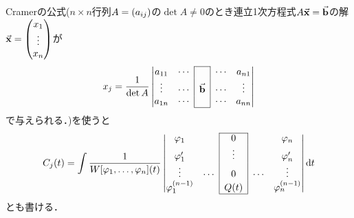 \documentclass[autodetect-engine,dvipdfmx-if-dvi,ja=standard]{bxjsarticle}
\theoremstyle{mystyle1}
\theoremstyle{mystyle2}
\begin{document}
Cramerの公式($n\times n$行列$A=\qty(a_{ij})$の$\det A\neq 0$のとき連立1次方程式$A\va{x}=\va{b}$の解$\va{x}=\mqty(x_1\\\vdots\\x_n)$が\begin{align*}
  x_j=\frac{1}{\det A}\mdet{
    \cline{3-3}
  a_{11} & \cdots & \multicolumn{1}{|c|}{ }      & \cdots & a_{n1} \\
  \vdots & \cdots & \multicolumn{1}{|c|}{\va{b}} & \cdots & \vdots \\
  a_{1n} & \cdots & \multicolumn{1}{|c|}{ }      & \cdots & a_{nn} \\
    \cline{3-3}
  }
\end{align*}で与えられる．)を使うと\begin{align*}
  C_j\qty(t)=\int\frac{1}{W\qty[\varphi_1,\ldots,\varphi_n]\qty(t)}\mdet{
    \cline{3-3}
  \varphi_1             &        & \multicolumn{1}{|c|}{0}        &        & \varphi_n             \\
  \varphi_1^\prime      &        & \multicolumn{1}{|c|}{\vdots}   &        & \varphi_n^\prime      \\
  \vdots                & \cdots & \multicolumn{1}{|c|}{0}        & \cdots & \vdots                \\
  \varphi_1^{\qty(n-1)} &        & \multicolumn{1}{|c|}{Q\qty(t)} &        & \varphi_n^{\qty(n-1)} \\
    \cline{3-3}
  }\dd{t}
\end{align*}とも書ける．
\end{document}
